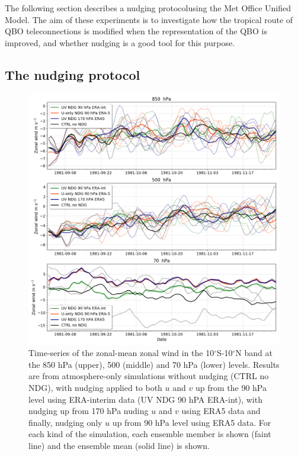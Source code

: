 The following section describes a nudging protocolusing the Met Office Unified Model. The aim of these experiments is to investigate how the tropical route of QBO teleconnections is modified when the representation of the QBO is improved, and whether nudging is a good tool for this purpose.

\subsection{The nudging protocol}

\begin{figure}[t!]
\centering
 \includegraphics[width=\linewidth]{figures/u_test__.png}
\caption[Time-series of zonal-mean winds under different nudging conditions]{Time-series of the zonal-mean zonal wind in the 10$^\circ$S-10$^\circ$N band at the 850 hPa (upper), 500 (middle) and 70 hPa (lower) levels. Results are from atmosphere-only simulations without nudging (CTRL no NDG), with nudging applied to both $u$ and $v$ up from the 90 hPa level using ERA-interim data (UV NDG 90 hPA ERA-int), with nudging up from 170 hPa nuding $u$ and $v$ using ERA5 data and finally, nudging only $u$ up from 90 hPa level using ERA5 data. For each kind of the simulation, each ensemble member is shown (faint line) and the ensemble mean (solid line) is shown. }
\label{fig:u_nudg_stv}
\end{figure}

